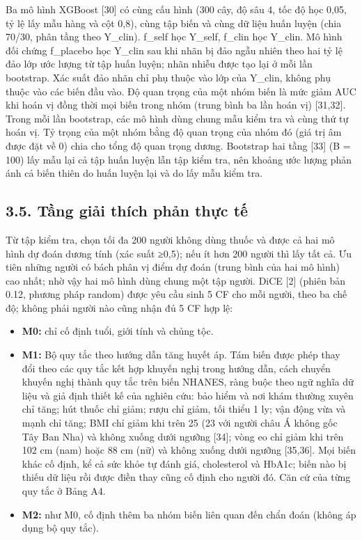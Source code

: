 \documentclass[9pt,a4paper]{extarticle}
\providecommand{\tightlist}{\setlength{\itemsep}{0pt}\setlength{\parskip}{0pt}}
\begin{document}
Ba mô hình XGBoost {[}30{]} có cùng cấu hình (300 cây, độ sâu 4, tốc độ
học 0,05, tỷ lệ lấy mẫu hàng và cột 0,8), cùng tập biến và cùng dữ liệu
huấn luyện (chia 70/30, phân tầng theo Y\_clin). f\_self học Y\_self,
f\_clin học Y\_clin. Mô hình đối chứng f\_placebo học Y\_clin sau khi
nhãn bị đảo ngẫu nhiên theo hai tỷ lệ đảo lớp ước lượng từ tập huấn
luyện; nhãn nhiễu được tạo lại ở mỗi lần bootstrap. Xác suất đảo nhãn
chỉ phụ thuộc vào lớp của Y\_clin, không phụ thuộc vào các biến đầu vào.
Độ quan trọng của một nhóm biến là mức giảm AUC khi hoán vị đồng thời
mọi biến trong nhóm (trung bình ba lần hoán vị) {[}31,32{]}. Trong mỗi
lần bootstrap, các mô hình dùng chung mẫu kiểm tra và cùng thứ tự hoán
vị. Tỷ trọng của một nhóm bằng độ quan trọng của nhóm đó (giá trị âm
được đặt về 0) chia cho tổng độ quan trọng dương. Bootstrap hai tầng
{[}33{]} (B = 100) lấy mẫu lại cả tập huấn luyện lẫn tập kiểm tra, nên
khoảng ước lượng phản ánh cả biến thiên do huấn luyện lại và do lấy mẫu
kiểm tra.

\subsection{3.5. Tầng giải thích phản thực tế}

Từ tập kiểm tra, chọn tối đa 200 người không dùng thuốc và được cả hai
mô hình dự đoán dương tính (xác suất ≥0,5); nếu ít hơn 200 người thì lấy
tất cả. Ưu tiên những người có bách phân vị điểm dự đoán (trung bình của
hai mô hình) cao nhất; nhờ vậy hai mô hình dùng chung một tập người.
DiCE {[}2{]} (phiên bản 0.12, phương pháp random) được yêu cầu sinh 5 CF
cho mỗi người, theo ba chế độ; không phải người nào cũng nhận đủ 5 CF
hợp lệ:

\begin{itemize}
\tightlist
\item
  \textbf{M0:} chỉ cố định tuổi, giới tính và chủng tộc.
\item
  \textbf{M1:} Bộ quy tắc theo hướng dẫn tăng huyết áp. Tám biến được
  phép thay đổi theo các quy tắc kết hợp khuyến nghị trong hướng dẫn,
  cách chuyển khuyến nghị thành quy tắc trên biến NHANES, ràng buộc theo
  ngữ nghĩa dữ liệu và giả định thiết kế của nghiên cứu: bảo hiểm và nơi
  khám thường xuyên chỉ tăng; hút thuốc chỉ giảm; rượu chỉ giảm, tối
  thiểu 1 ly; vận động vừa và mạnh chỉ tăng; BMI chỉ giảm khi trên 25
  (23 với người châu Á không gốc Tây Ban Nha) và không xuống dưới ngưỡng
  {[}34{]}; vòng eo chỉ giảm khi trên 102 cm (nam) hoặc 88 cm (nữ) và
  không xuống dưới ngưỡng {[}35,36{]}. Mọi biến khác cố định, kể cả sức
  khỏe tự đánh giá, cholesterol và HbA1c; biến nào bị thiếu dữ liệu rồi
  được điền thay cũng cố định cho người đó. Căn cứ của từng quy tắc ở
  Bảng A4.
\item
  \textbf{M2:} như M0, cố định thêm ba nhóm biến liên quan đến chẩn đoán
  (không áp dụng bộ quy tắc).
\end{itemize}
\end{document}
